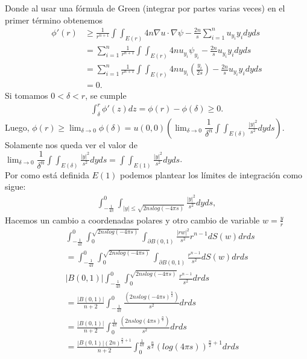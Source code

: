 \begin{homeworkProblem}
\begin{solucion}
    Donde al usar una fórmula de Green (integrar por partes varias veces) en el primer término obtenemos
    \begin{align*}
      \phi ' (r) &\geq \frac{1}{r^{n+1}} \int \int_{E(r)} 4n \nabla u \cdot \nabla \psi - \frac{2n}{s} \displaystyle \sum_{i=1}^{n} u_{y_{i}}y_{i} dyds\\ 
                 &=\displaystyle \sum_{i=1}^{n} \frac{1}{r^{n+1}} \int \int_{E(r)} 4n u_{y_{i}} \psi_{y_{i}} - \frac{2n}{s} u_{y_{i}}y_{i} dyds\\ 
                 &= \displaystyle \sum_{i=1}^{n} \frac{1}{r^{n+1}} \int \int_{E(r)} 4n u_{y_{i}} \left( \frac{y_{i}}{2s}\right) - \frac{2n}{s} u_{y_{i}}y_{i} dyds\\ 
                 &=0.
    \end{align*} 
    Si tomamos $0< \delta < r$, se cumple
    \begin{align*}
      \int_{\delta}^{r} \phi '(z) dz = \phi(r) - \phi(\delta) \geq 0.
    \end{align*}
    Luego, $\phi(r) \geq \lim_{\delta \rightarrow 0} \phi(\delta) = u(0,0) \left(\lim_{\delta \rightarrow 0} \dfrac{1}{\delta ^{n}} \displaystyle \int \displaystyle \int_{E(\delta)} \frac{|y|^{2}}{s^{2}} dyds\right)$.\\ 
    Solamente nos queda ver el valor de $\lim_{\delta \rightarrow 0} \dfrac{1}{\delta ^{n}} \displaystyle \int \displaystyle \int_{E(\delta)} \frac{|y|^{2}}{s^{2}} dyds = \displaystyle \int \displaystyle \int_{E(1)} \frac{|y|^{2}}{s^{2}} dyds$.\\ 
    Por como está definida $E(1)$ podemos plantear los límites de integración como sigue:
    \begin{align*}
      \int_{-\frac{1}{4\pi}}^{0} \int_{|y| \leq \sqrt{2nslog(-4\pi s)}} \frac{|y|^{2}}{s^{2}} dyds,
    \end{align*}
    Hacemos un cambio a coordenadas polares y otro cambio de variable $w = \frac{y}{r}$
    \begin{align*}
      &\int_{-\frac{1}{4\pi}}^{0} \int_{0}^{\sqrt{2nslog(-4\pi s)}} \int_{\partial B(0,1)} \frac{|rw|^{2}}{s^{2}} r^{n-1} dS(w)drds\\
      &= \int_{-\frac{1}{4\pi}}^{0} \int_{0}^{\sqrt{2nslog(-4\pi s)}} \int_{\partial B(0,1)} \frac{r^{n-1}}{s^{2}} dS(w)drds\\
      &|B(0,1)| \int_{-\frac{1}{4\pi}}^{0} \int_{0}^{\sqrt{2nslog(-4\pi s)}} \frac{r^{n-1}}{s^{2}} drds\\ 
      &= \frac{|B(0,1)|}{n+2} \int_{-\frac{1}{4\pi}}^{0} \frac{(2nslog(-4\pi s)^{\frac{n}{2}})}{s^{2}} drds\\
      &= \frac{|B(0,1)|}{n+2} \int_{0}^{\frac{1}{4\pi}} \frac{(2nslog(4\pi s)^{\frac{n}{2}})}{s^{2}} drds\\
      &= \frac{|B(0,1)|(2n)^{\frac{n}{2}+1}}{n+2} \int_{0}^{\frac{1}{4\pi}} s^{\frac{n}{2}} (log(4\pi s))^{\frac{n}{2}+1}drds
    \end{align*}
    \demostrado
  \end{solucion}  
\end{homeworkProblem}
